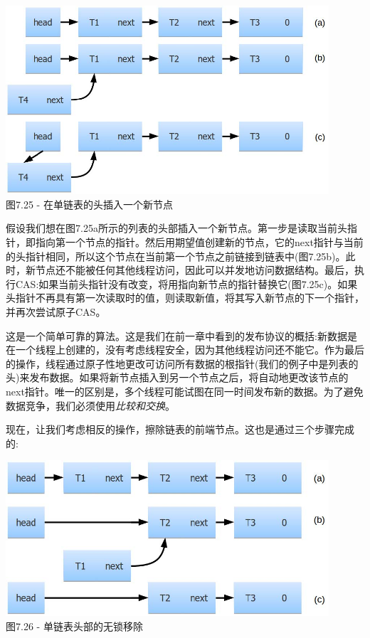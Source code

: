 \begin{center}
\includegraphics[width=0.9\textwidth]{content/2/chapter7/images/25.jpg}\\
图7.25 - 在单链表的头插入一个新节点
\end{center}

假设我们想在图7.25a所示的列表的头部插入一个新节点。第一步是读取当前头指针，即指向第一个节点的指针。然后用期望值创建新的节点，它的next指针与当前的头指针相同，所以这个节点在当前第一个节点之前链接到链表中(图7.25b)。此时，新节点还不能被任何其他线程访问，因此可以并发地访问数据结构。最后，执行CAS:如果当前头指针没有改变，将用指向新节点的指针替换它(图7.25c)。如果头指针不再具有第一次读取时的值，则读取新值，将其写入新节点的下一个指针，并再次尝试原子CAS。

这是一个简单可靠的算法。这是我们在前一章中看到的发布协议的概括:新数据是在一个线程上创建的，没有考虑线程安全，因为其他线程访问还不能它。作为最后的操作，线程通过原子性地更改可访问所有数据的根指针(我们的例子中是列表的头)来发布数据。如果将新节点插入到另一个节点之后，将自动地更改该节点的next指针。唯一的区别是，多个线程可能试图在同一时间发布新的数据。为了避免数据竞争，我们必须使用\textit{比较和交换}。 

现在，让我们考虑相反的操作，擦除链表的前端节点。这也是通过三个步骤完成的:

\begin{center}
\includegraphics[width=0.9\textwidth]{content/2/chapter7/images/26.jpg}\\
图7.26 - 单链表头部的无锁移除
\end{center}

